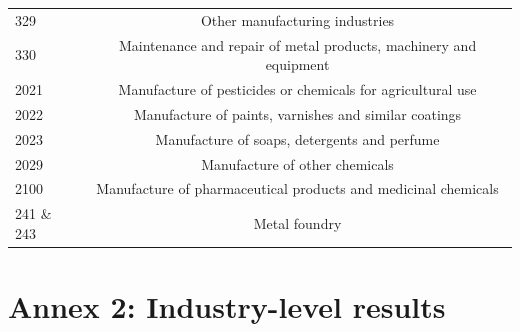 \documentclass[12pt,a4paper]{article}
\begin{document}
{\begin{longtable}{@{}lc@{}}
	329                                            & Other manufacturing industries                                           \\
	330                                            & Maintenance and repair of metal   products, machinery and equipment      \\
	2021                                           & Manufacture of pesticides or   chemicals for agricultural use            \\
	2022                                           & Manufacture of paints, varnishes   and similar coatings                  \\
	2023                                           & Manufacture of soaps, detergents   and perfume                           \\
	2029                                           & Manufacture of other chemicals                                           \\
	2100                                           & Manufacture of pharmaceutical   products and medicinal chemicals         \\
	241 \& 243                 							 & Metal foundry                                                            \\ \bottomrule
\end{longtable}

\section{Annex 2: Industry-level results}

}
\end{document}
